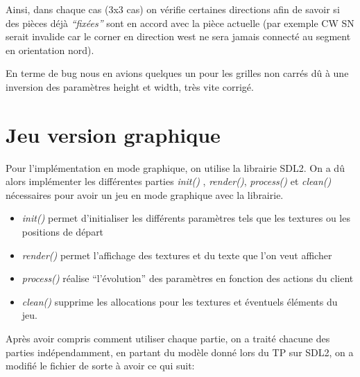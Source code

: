 ﻿\documentclass[12pt]{article}
\begin{document}
\bigskip

Ainsi, dans chaque cas (3x3 cas) on vérifie certaines directions afin de savoir si des pièces déjà \emph{“fixées”} sont en accord avec la pièce actuelle (par exemple CW SN serait invalide car le corner en direction west ne sera jamais connecté au segment en orientation nord).


En terme de bug nous en avions quelques un pour les grilles non carrés dû à une inversion des paramètres height et width, très vite corrigé.


\section{Jeu version graphique}


Pour l’implémentation en mode graphique, on utilise la librairie SDL2. On a dû alors implémenter les différentes parties \emph{init()} , \emph{render()}, \emph{process()} et \emph{clean()} nécessaires pour avoir un jeu en mode graphique avec la librairie.


\begin{itemize}
\item \emph{init()} permet d’initialiser les différents paramètres tels que les textures ou les positions de départ
\item \emph{render()} permet l’affichage des textures et du texte que l’on veut afficher
\item \emph{process()} réalise “l’évolution” des paramètres en fonction des actions du client
\item \emph{clean()} supprime les allocations pour les textures et éventuels éléments du jeu.
\end{itemize}


Après avoir compris comment utiliser chaque partie, on a traité chacune des parties indépendamment, en partant du modèle donné lors du TP sur SDL2, on a modifié le fichier de sorte à avoir ce qui suit:
\end{document}
